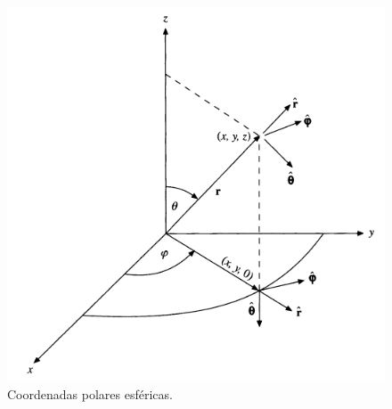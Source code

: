 \begin{figure}[H]
    \centering
    \includegraphics[scale=0.5]{Imagenes/CoordenadasEsfericasVectoresUnitarios.png}
    \caption{Coordenadas polares esféricas.}
    \label{fig:figura_coordenadas_esfericas_vu}
\end{figure}
%
%
